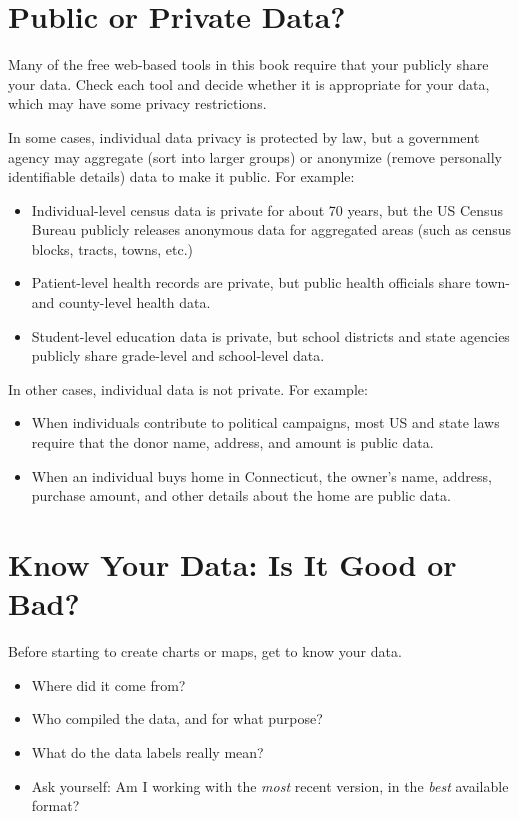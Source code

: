 \documentclass[
  english,
]{book}
\providecommand{\tightlist}{%
  \setlength{\itemsep}{0pt}\setlength{\parskip}{0pt}}
\begin{document}
\hypertarget{public}{%
\section{Public or Private Data?}\label{public}}

Many of the free web-based tools in this book require that your publicly share your data. Check each tool and decide whether it is appropriate for your data, which may have some privacy restrictions.

In some cases, individual data privacy is protected by law, but a government agency may aggregate (sort into larger groups) or anonymize (remove personally identifiable details) data to make it public. For example:

\begin{itemize}
\tightlist
\item
  Individual-level census data is private for about 70 years, but the US Census Bureau publicly releases anonymous data for aggregated areas (such as census blocks, tracts, towns, etc.)
\item
  Patient-level health records are private, but public health officials share town- and county-level health data.
\item
  Student-level education data is private, but school districts and state agencies publicly share grade-level and school-level data.
\end{itemize}

In other cases, individual data is not private. For example:

\begin{itemize}
\tightlist
\item
  When individuals contribute to political campaigns, most US and state laws require that the donor name, address, and amount is public data.
\item
  When an individual buys home in Connecticut, the owner's name, address, purchase amount, and other details about the home are public data.
\end{itemize}

\hypertarget{know}{%
\section{Know Your Data: Is It Good or Bad?}\label{know}}

Before starting to create charts or maps, get to know your data.

\begin{itemize}
\tightlist
\item
  Where did it come from?
\item
  Who compiled the data, and for what purpose?
\item
  What do the data labels really mean?
\item
  Ask yourself: Am I working with the \emph{most} recent version, in the \emph{best} available format?
\end{itemize}
\end{document}

